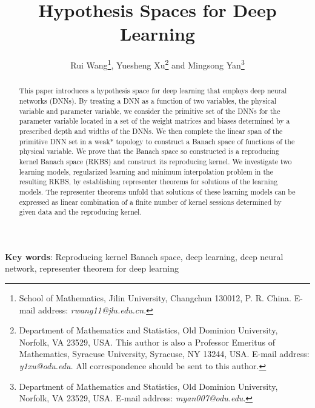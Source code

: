 \documentclass[11pt]{article}
\begin{document}
\title{Hypothesis Spaces for Deep Learning}

\author{Rui Wang\thanks{School of Mathematics, Jilin University, Changchun 130012, P. R. China. E-mail address: {\it rwang11@jlu.edu.cn}.}, \quad Yuesheng Xu\thanks{Department of Mathematics and Statistics, Old Dominion University, Norfolk, VA 23529, USA. This author is also a Professor Emeritus of Mathematics, Syracuse University, Syracuse, NY 13244, USA. E-mail address: {\it y1xu@odu.edu.} All correspondence should be sent to this author.} \quad and \quad Mingsong Yan\thanks{
Department of Mathematics and Statistics, Old Dominion University, Norfolk, VA 23529, USA. E-mail address: {\it myan007@odu.edu}.}}
\date{}

\maketitle

\begin{abstract}
This paper introduces a hypothesis space for deep learning that employs deep neural networks (DNNs). By treating a DNN as a function of two variables, the physical variable and parameter variable, we consider the primitive set of the DNNs for the parameter variable located in a set of the weight matrices and biases determined by a prescribed depth and widths of the DNNs. We then complete the linear span of the primitive DNN set in a weak* topology to construct a Banach space of functions of the physical variable. We prove that the Banach space so constructed is a reproducing kernel Banach space (RKBS) and construct its reproducing kernel. We investigate two learning models, regularized learning and minimum interpolation problem in the resulting RKBS, by establishing representer theorems for solutions of the learning models. The representer theorems unfold that solutions of these learning models can be expressed as linear combination of a finite number of kernel sessions determined by given data and the reproducing kernel.
\end{abstract}


\textbf{Key words}:
    Reproducing kernel Banach space, deep learning, deep neural network, representer theorem for deep learning
\end{document}
